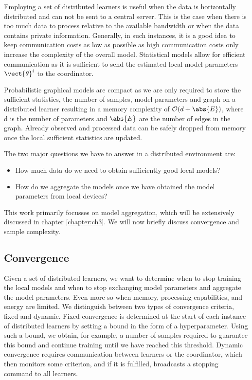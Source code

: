 Employing a set of distributed learners is useful when the data is horizontally distributed and can not be sent to a central server.
This is the case when there is too much data to process relative to the available bandwidth or when the data contains private information.
Generally, in such instances, it is a good idea to keep communication costs as low as possible as high communication costs only increase the complexity of the overall model.
Statistical models allow for efficient communication as it is sufficient to send the estimated local model parameters $\vect{\theta}^i$ to the coordinator. 

Probabilistic graphical models are compact as we are only required to store the sufficient statistics, the number of samples, model parameters and graph on a distributed learner resulting in a memory complexity of $\mathcal{O}(d + \abs{E})$, where d is the number of parameters and $\abs{E}$ are the number of edges in the graph. 
Already observed and processed data can be safely dropped from memory once the local sufficient statistics are updated.

The two major questions we have to answer in a distributed environment are:
\begin{itemize}
    \item How much data do we need to obtain sufficiently good local models?
    \item How do we aggregate the models once we have obtained the model parameters from local devices?
\end{itemize}

This work primarily focusses on model aggregation, which will be extensively discussed in chapter \ref{chapter:ch3}. 
We will now briefly discuss convergence and sample complexity.

\subsection{Convergence}
Given a set of distributed learners, we want to determine when to stop training the local models and when to stop exchanging model parameters and aggregate the model parameters.
Even more so when memory, processing capabilities, and energy are limited.
We distinguish between two types of convergence criteria, fixed and dynamic.
Fixed convergence is determined at the start of each instance of distributed learners by setting a bound in the form of a hyperparameter.
Using such a bound, we obtain, for example, a number of samples required to guarantee this bound and continue training until we have reached this threshold.
Dynamic convergence requires communication between learners or the coordinator, which then monitors some criterion, and if it is fulfilled, broadcasts a stopping command to all learners. 

